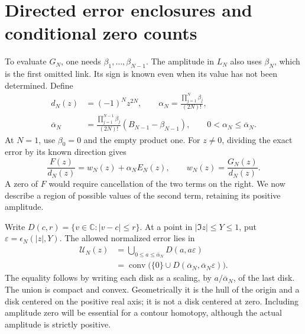 \section{Directed error enclosures and conditional zero counts}
\label{sec:directed}

To evaluate \(G_N\), one needs \(\beta_1,\ldots,\beta_{N-1}\).
The amplitude in \(L_N\) also uses \(\beta_N\), which is the first
omitted link. Its sign is known even when its value has not been
determined. Define
\begin{equation}
 \begin{aligned}
 d_N(z)&=(-1)^Nz^{2N},\qquad
 \alpha_N=\frac{\prod_{j=1}^{N}\beta_j}{(2N)!},\\
 \overline\alpha_N&=
 \frac{\prod_{j=1}^{N-1}\beta_j}{(2N)!}
                      (B_{N-1}-\beta_{N-1}),
 \qquad 0<\alpha_N\le\overline\alpha_N.
 \end{aligned}
 \label{eq:amplitude-budget}
\end{equation}
At \(N=1\), use \(\beta_0=0\) and the empty product one.
For \(z\ne0\), dividing the exact error by its known direction gives
\begin{equation}
 \frac{F(z)}{d_N(z)}=w_N(z)+\alpha_NE_N(z),\qquad
 w_N(z)=\frac{G_N(z)}{d_N(z)}.
 \label{eq:normalized-error}
\end{equation}
A zero of \(F\) would require cancellation of the two terms on the
right. We now describe a region of possible values of the second
term, retaining its positive amplitude.

Write \(D(c,r)=\{v\in\mathbb C:|v-c|\le r\}\). At a point
in \(|\Im z|\le Y\le1\), put \(\varepsilon=\epsilon_N(|z|,Y)\).
The allowed normalized error lies in
\begin{equation}
 \begin{split}
 \mathcal U_N(z)&=\bigcup_{0\le a\le\overline\alpha_N}D(a,a\varepsilon)\\
 &=\operatorname{conv}\bigl(\{0\}\cup
 D(\overline\alpha_N,\overline\alpha_N\varepsilon)\bigr).
 \end{split}
 \label{eq:directed-set}
\end{equation}
The equality follows by writing each disk as a scaling, by
\(a/\overline\alpha_N\), of the last disk. The union is compact
and convex. Geometrically it is the hull of the origin and a disk
centered on the positive real axis; it is not a disk centered at zero.
Including amplitude zero will be essential for a contour homotopy,
although the actual amplitude is strictly positive.

